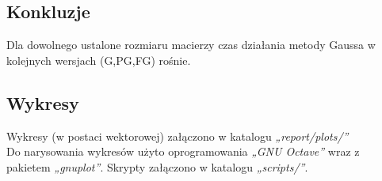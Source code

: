 \documentclass[12pt]{article}
\newenvironment{hypothesis}[2][Hipoteza]{\begin{trivlist}
\item[\hskip \labelsep {\bfseries #1}\hskip \labelsep {\bfseries #2.}]}{\end{trivlist}}
\begin{document}
\subsection{Konkluzje}
\begin{hypothesis}{1}
Dla dowolnego ustalone rozmiaru macierzy czas działania metody Gaussa w kolejnych wersjach (G,PG,FG) rośnie.
\end{hypothesis}

\subsection{Wykresy}
Wykresy (w postaci wektorowej) załączono w katalogu \textit{„report/plots/”}\\
Do narysowania wykresów użyto oprogramowania \textit{„GNU Octave”} wraz z pakietem \textit{„gnuplot”}. Skrypty załączono w katalogu \textit{„scripts/”}.
\end{document}
